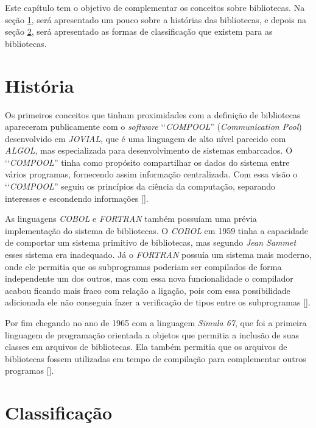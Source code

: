 Este capítulo tem o objetivo de complementar os conceitos sobre bibliotecas. Na seção
\ref{section:historia_das_biblioteca}, será apresentado um pouco sobre a histórias das bibliotecas,
e depois na seção \ref{section:classificação_das_bibliotecas}, será apresentado as formas de
classificação que existem para as bibliotecas.


\section{História}
\label{section:historia_das_biblioteca}

Os primeiros conceitos que tinham proximidades com a definição de bibliotecas apareceram publicamente
com o \emph{software} ‘‘\emph{COMPOOL}'' (\emph{Communication Pool}) desenvolvido em \emph{JOVIAL},
que é uma linguagem de alto nível parecido com \emph{ALGOL}, mas especializada para desenvolvimento
de sistemas embarcados. O ‘‘\emph{COMPOOL}'' tinha como propósito compartilhar os dados do
sistema entre vários programas, fornecendo assim informação centralizada. Com essa visão o
‘‘\emph{COMPOOL}'' seguiu os princípios da ciência da computação, separando interesses e
escondendo informações [].

As linguagens \emph{COBOL} e \emph{FORTRAN} também possuíam uma prévia implementação do sistema de
bibliotecas. O \emph{COBOL} em 1959 tinha a capacidade de comportar um sistema primitivo de
bibliotecas, mas segundo \emph{Jean Sammet} esses sistema era inadequado. Já o
\emph{FORTRAN} possuía um sistema mais moderno, onde ele permitia que os subprogramas poderiam ser
compilados de forma independente um dos outros, mas com essa nova funcionalidade o compilador acabou
ficando mais fraco com relação a ligação, pois com essa possibilidade adicionada ele não conseguia
fazer a verificação de tipos entre os subprogramas [].

Por fim chegando no ano de 1965 com a linguagem \emph{Simula 67}, que foi a primeira linguagem
de programação orientada a objetos que permitia a inclusão de suas classes em arquivos de bibliotecas.
Ela também permitia que os arquivos de bibliotecas fossem utilizadas em tempo de compilação para
complementar outros programas [].


\section{Classificação}
\label{section:classificação_das_bibliotecas}

